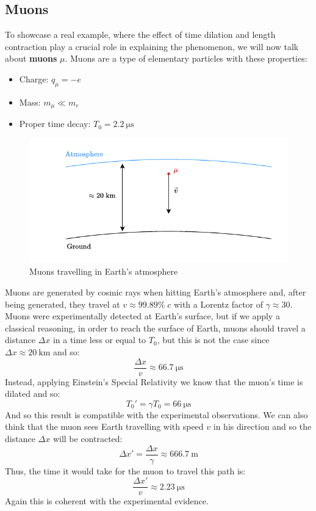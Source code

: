 \subsection{Muons}
To showcase a real example, where the effect of time dilation and length contraction play a crucial role in explaining the phenomenon, we will now talk about \textbf{muons} $\mu$. Muons are a type of elementary particles with these properties:
\begin{itemize}
  \item Charge: $q_{\mu} = -e$
  \item Mass: $m_{\mu} \ll m_{e}$
  \item Proper time decay: $T_0 = \qty{2.2}{\micro\second}$
\end{itemize}
\begin{figure}[H]
  \centering
  \includegraphics[width=0.8\linewidth]{res/svg/muons_bad.drawio}
  \caption{Muons travelling in Earth's atmosphere}
\end{figure}
Muons are generated by cosmic rays when hitting Earth's atmosphere and, after being generated, they travel at $v \approx 99.89\%\;c$ with a Lorentz factor of $\gamma \approx 30$. Muons were experimentally detected at Earth's surface, but if we apply a classical reasoning, in order to reach the surface of Earth, muons should travel a distance $\Delta x$ in a time less or equal to $T_0$, but this is not the case since $\Delta x \approx \qty{20}{\kilo\meter}$ and so:
\begin{equation}
  \dfrac{\Delta x}{v} \approx \qty{66.7}{\micro\second}
\end{equation}
Instead, applying Einstein's Special Relativity we know that the muon's time is dilated and so:
\begin{equation}
  T_0' = \gamma T_0 = \qty{66}{\micro\second}
\end{equation}
And so this result is compatible with the experimental observations. We can also think that the muon sees Earth travelling with speed $v$ in his direction and so the distance $\Delta x$ will be contracted:
\begin{equation}
  \Delta x' = \dfrac{\Delta x}{\gamma} \approx \qty{666.7}{\meter}
\end{equation}
Thus, the time it would take for the muon to travel this path is:
\begin{equation}
  \dfrac{\Delta x'}{v} \approx \qty{2.23}{\micro\second}
\end{equation}
Again this is coherent with the experimental evidence.
